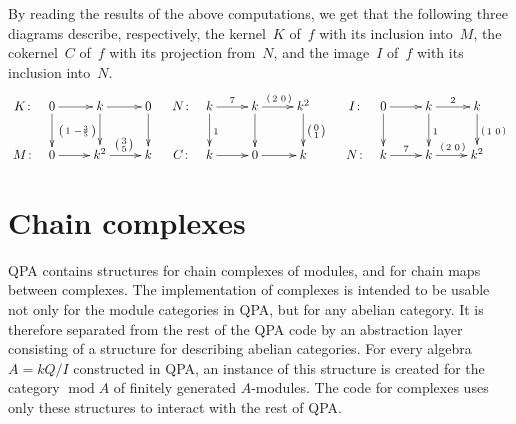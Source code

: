 \documentclass{amsart}
\renewcommand{\mod}{\operatorname{mod}\nolimits}
\theoremstyle{definition}
\newcommand{\vv}[2]{\left( \begin{smallmatrix} #1 & #2 \end{smallmatrix} \right)}
\theoremstyle{theoretic}
\begin{document}
By reading the results of the above computations, we get that the
following three diagrams describe, respectively, the kernel~$K$ of~$f$
with its inclusion into~$M$, the cokernel~$C$ of~$f$ with its projection
from~$N$, and the image~$I$ of~$f$ with its inclusion into~$N$.
\[
\xymatrix@C=.4em{
K\colon &
0 \ar[rrr]\ar[d] &&&
k \ar[rrr]\ar[d]_{\vv{1}{-\frac{3}{5}}} &&&
0 \ar[d]
\\
M\colon &
0 \ar[rrr] &&&
k^2 \ar[rrr]^{\left( \begin{smallmatrix} 3\\5 \end{smallmatrix} \right)} &&&
k
}
\quad
\xymatrix@C=.4em{
N\colon &
k \ar[rrr]^7\ar[d]^{1} &&&
k \ar[rrr]^{\vv{2}{0}}\ar[d] &&&
k^2 \ar[d]^{\left( \begin{smallmatrix} 0\\1 \end{smallmatrix} \right)}
\\
C\colon &
k \ar[rrr] &&&
0 \ar[rrr] &&&
k
}
\quad
\xymatrix@C=.4em{
I\colon &
0 \ar[rrr]\ar[d] &&&
k \ar[rrr]^2\ar[d]^1 &&&
k \ar[d]^{\vv{1}{0}}
\\
N\colon &
k \ar[rrr]^7 &&&
k \ar[rrr]^{\vv{2}{0}} &&&
k^2
}
\]





\section{Chain complexes}%

QPA contains structures for chain complexes of modules, and for chain
maps between complexes.  The implementation of complexes is intended
to be usable not only for the module categories in QPA, but for any
abelian category.  It is therefore separated from the rest of the QPA
code by an abstraction layer consisting of a structure for describing
abelian categories.  For every algebra $A = kQ/I$ constructed in QPA,
an instance of this structure is created for the category $\mod A$ of
finitely generated $A$-modules.  The code for complexes uses only
these structures to interact with the rest of QPA.
\end{document}
